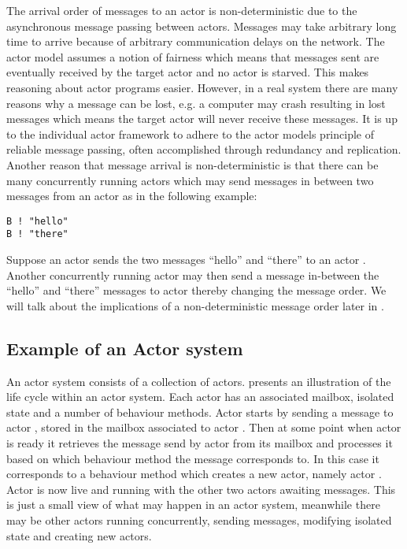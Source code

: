The arrival order of messages to an actor is non-deterministic due to the asynchronous message passing between actors\cite[p. 2]{karmani2011actors}. Messages may take arbitrary long time to arrive because of arbitrary communication delays on the network. The actor model assumes a notion of fairness which means that messages sent are eventually received by the target actor and no actor is starved\cite[Chap. 2.5]{haller2012actors}\cite[p. 3]{karmani2009actor}. This makes reasoning about actor programs easier\cite{tasharofi2013scala}. However, in a real system there are many reasons why a message can be lost, e.g. a computer may crash resulting in lost messages which means the target actor will never receive these messages. It is up to the individual actor framework to adhere to the actor models principle of reliable message passing, often accomplished through redundancy and replication\cite[Chap. 2.5]{haller2012actors}. Another reason that message arrival is non-deterministic is that there can be many concurrently running actors which may send messages in between two messages from an actor as in the following example:
\begin{verbatim}
B ! "hello"
B ! "there"
\end{verbatim}
Suppose an actor  sends the two messages ``hello'' and ``there'' to an actor . Another concurrently running actor  may then send a message in-between the ``hello'' and ``there'' messages to actor  thereby changing the message order. We will talk about the implications of a non-deterministic message order later in .

\subsection{Example of an Actor system}
An actor system consists of a collection of actors.  presents an illustration of the life cycle within an actor system. Each actor has an associated mailbox, isolated state and a number of behaviour methods. Actor  starts by sending a message to actor , stored in the mailbox associated to actor . Then at some point when actor  is ready it retrieves the message send by actor  from its mailbox and processes it based on which behaviour method the message corresponds to. In this case it corresponds to a behaviour method which creates a new actor, namely actor . Actor  is now live and running with the other two actors awaiting messages. This is just a small view of what may happen in an actor system, meanwhile there may be other actors running concurrently, sending messages, modifying isolated state and creating new actors.

